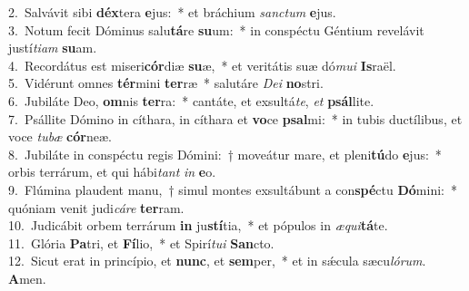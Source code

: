 {2.~}Salvávit sibi \textbf{déx}tera \textbf{e}jus:~* et bráchium \textit{san}\textit{ctum} \textbf{e}jus.\\
{3.~}Notum fecit Dóminus salu\textbf{tá}re \textbf{su}um:~* in conspéctu Géntium revelávit justí\textit{ti}\textit{am} \textbf{su}am.\\
{4.~}Recordátus est miseri\textbf{cór}diæ \textbf{su}æ,~* et veritátis suæ dó\textit{mu}\textit{i} \textbf{Is}raël.\\
{5.~}Vidérunt omnes \textbf{tér}mini \textbf{ter}ræ~* salutáre \textit{De}\textit{i} \textbf{no}stri.\\
{6.~}Jubiláte Deo, \textbf{om}nis \textbf{ter}ra:~* cantáte, et exsultá\textit{te}, \textit{et} \textbf{psál}lite.\\
{7.~}Psállite Dómino in cíthara, in cíthara et \textbf{vo}ce \textbf{psal}mi:~* in tubis ductílibus, et voce \textit{tu}\textit{bæ} \textbf{cór}neæ.\\
{8.~}Jubiláte in conspéctu regis Dómini:~† moveátur mare, et pleni\textbf{tú}do \textbf{e}jus:~* orbis terrárum, et qui hábi\textit{tant} \textit{in} \textbf{e}o.\\
{9.~}Flúmina plaudent manu,~† simul montes exsultábunt a con\textbf{spé}ctu \textbf{Dó}mini:~* quóniam venit judi\textit{cá}\textit{re} \textbf{ter}ram.\\
{10.~}Judicábit orbem terrárum \textbf{in} ju\textbf{stí}tia,~* et pópulos in \textit{æ}\textit{qui}\textbf{tá}te.\\
{11.~}Glória \textbf{Pa}tri, et \textbf{Fí}lio,~* et Spirí\textit{tu}\textit{i} \textbf{San}cto.\\
{12.~}Sicut erat in princípio, et \textbf{nunc}, et \textbf{sem}per,~* et in sǽcula sæcu\textit{ló}\textit{rum}. \textbf{A}men.\\
